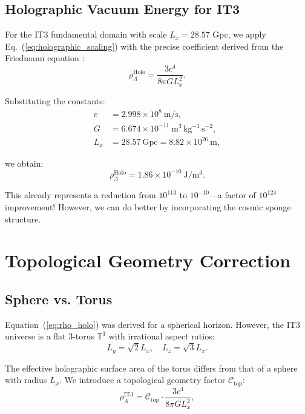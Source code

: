 \documentclass[12pt,a4paper]{article}
\begin{document}
\subsection{Holographic Vacuum Energy for IT3}

For the IT3 fundamental domain with scale $L_x = 28.57$ Gpc, we apply Eq.~(\ref{eq:holographic_scaling}) with the precise coefficient derived from the Friedmann equation \citep{Cohen1999}:
\begin{equation}
\rho_{\Lambda}^{\mathrm{Holo}} = \frac{3 c^4}{8 \pi G L_x^2}.
\label{eq:rho_holo}
\end{equation}

Substituting the constants:
\begin{align}
c &= 2.998 \times 10^8~\mathrm{m/s}, \\
G &= 6.674 \times 10^{-11}~\mathrm{m^3\,kg^{-1}\,s^{-2}}, \\
L_x &= 28.57~\mathrm{Gpc} = 8.82 \times 10^{26}~\mathrm{m},
\end{align}

we obtain:
\begin{equation}
\rho_{\Lambda}^{\mathrm{Holo}} = 1.86 \times 10^{-10}~\mathrm{J/m^3}.
\end{equation}

This already represents a reduction from $10^{113}$ to $10^{-10}$—a factor of $10^{123}$ improvement! However, we can do better by incorporating the cosmic sponge structure.

\section{Topological Geometry Correction}

\subsection{Sphere vs. Torus}

Equation~(\ref{eq:rho_holo}) was derived for a spherical horizon. However, the IT3 universe is a flat 3-torus $\mathbb{T}^3$ with irrational aspect ratios:
\begin{equation}
L_y = \sqrt{2} L_x, \quad L_z = \sqrt{3} L_x.
\end{equation}

The effective holographic surface area of the torus differs from that of a sphere with radius $L_x$. We introduce a topological geometry factor $\mathcal{C}_{\mathrm{top}}$:
\begin{equation}
\rho_{\Lambda}^{\mathrm{IT3}} = \mathcal{C}_{\mathrm{top}} \cdot \frac{3 c^4}{8 \pi G L_x^2},
\end{equation}
\end{document}
